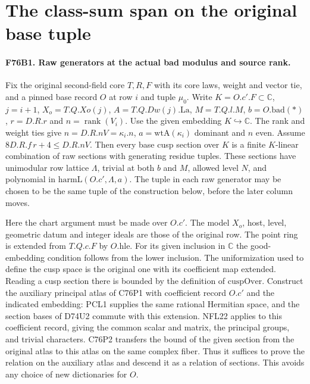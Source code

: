 \section{The class-sum span on the original base tuple}

\paragraph{F76B1. Raw generators at the actual bad modulus and source rank.}
Fix the original second-field core $T,R,F$ with its core laws,
weight and vector tie, and a pinned base record $O$ at row $i$ and
tuple $\mu_0$. Write $K=O.c'.F\subset\mathbb C$, $j=i+1$,
$X_o=T.Q.Xo(j)$, $A=T.Q.Dw(j).\mathrm{La}$, $M=T.Q.l.M$,
$b=O.\mathrm{bad}(*)$, $r=D.R.r$ and $n=\operatorname{rank}(V_i)$.
Use the given embedding $K\hookrightarrow\mathbb C$. The rank
and weight ties give $n=D.R.nV=\kappa_i.n$, $a=\mathrm{wtA}(\kappa_i)$
dominant and $n$ even. Assume $8D.R.f\,r+4\le D.R.nV$.
Then every base cusp section over $K$ is a finite $K$-linear
combination of raw sections with generating residue tuples. These
sections have unimodular row lattice $\Lambda$, trivial at both
$b$ and $M$, allowed level $N$, and polynomial in
$\mathrm{harmL}(O.c',\Lambda,a)$. The tuple in each raw
generator may be chosen to be the same tuple of the construction
below, before the later column moves.

Here the chart argument must be made over $O.c'$. The model
$X_o$, host, level, geometric datum and integer ideals are those
of the original row. The point ring is extended from $T.Q.c.F$
by $O.\mathrm{hle}$. For its given inclusion in $\mathbb C$ the
good-embedding condition follows from the lower inclusion.
The uniformization used to define the cusp space is the original
one with its coefficient map extended. Reading a cusp section
there is bounded by the definition of $\mathrm{cuspOver}$.
Construct the auxiliary principal atlas of C76P1 with coefficient
record $O.c'$ and the indicated embedding: PCL1 supplies the same
rational Hermitian space, and the section bases of D74U2 commute
with this extension. NFL22 applies to this coefficient record,
giving the common scalar and matrix, the principal groups, and
trivial characters. C76P2 transfers the bound of the given
section from the original atlas to this atlas on the same complex
fiber. Thus it suffices to prove the relation on the auxiliary
atlas and descend it as a relation of sections. This avoids any
choice of new dictionaries for $O$.

